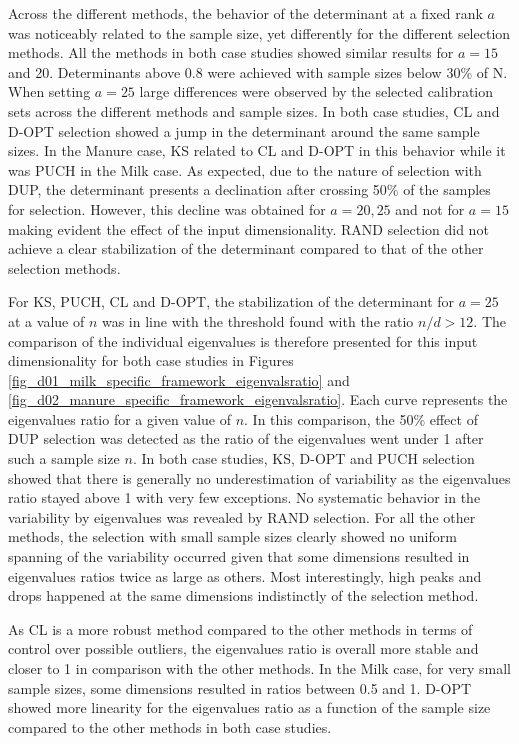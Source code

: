 \documentclass[journal=ancham,manuscript=article]{achemso}
\begin{document}
Across the different methods, the behavior of the determinant at a fixed rank $a$ was noticeably related to the sample size, yet differently for the different selection methods. All the methods in both case studies showed similar results for $a=15$ and 20. Determinants above 0.8 were achieved with sample sizes below 30\% of N. When setting $a=25$ large differences were observed by the selected calibration sets across the different methods and sample sizes. In both case studies, CL and D-OPT selection showed a jump in the determinant around the same sample sizes. In the Manure case, KS related to CL and D-OPT in this behavior while it was PUCH in the Milk case. As expected, due to the nature of selection with DUP, the determinant presents a declination after crossing 50\% of the samples for selection. However, this decline was obtained for $a=20, 25$ and not for $a=15$ making evident the effect of the input dimensionality. RAND selection did not achieve a clear stabilization of the determinant compared to that of the other selection methods.   

For KS, PUCH, CL and D-OPT, the stabilization of the determinant for $a=25$ at a value of $n$ was in line with the threshold found with the ratio $n/d>12$. The comparison of the individual eigenvalues is therefore presented for this input dimensionality for both case studies in Figures \ref{fig_d01_milk_specific_framework_eigenvalsratio} and \ref{fig_d02_manure_specific_framework_eigenvalsratio}. Each curve represents the eigenvalues ratio for a given value of $n$. In this comparison, the 50\% effect of DUP selection was detected as the ratio of the eigenvalues went under 1 after such a sample size $n$. In both case studies, KS, D-OPT and PUCH selection showed that there is generally no underestimation of variability as the eigenvalues ratio stayed above 1 with very few exceptions. No systematic behavior in the variability by eigenvalues was revealed by RAND selection. 
For all the other methods, the selection with small sample sizes clearly showed no uniform spanning of the variability occurred given that some dimensions resulted in eigenvalues ratios twice as large as others. Most interestingly, high peaks and drops happened at the same dimensions indistinctly of the selection method. 

As CL is a more robust method compared to the other methods in terms of control over possible outliers, the eigenvalues ratio is overall more stable and closer to 1 in comparison with the other methods. In the Milk case, for very small sample sizes, some dimensions resulted in ratios between 0.5 and 1. D-OPT showed more linearity for the eigenvalues ratio as a function of the sample size compared to the other methods in both case studies. 
\end{document}

